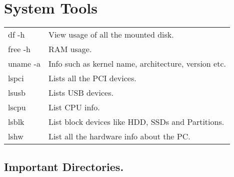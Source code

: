 \section{System Tools}

\begin{tabularx}{\linewidth}{lX}
    df -h                       & View usage of all the mounted disk.\\
    free -h                     & RAM usage.\\
    uname -a                    & Info such as kernel name, architecture, version etc.\\
    \hline

    lspci                       & Lists all the PCI devices.\\
    lsusb                       & Lists USB devices.\\
    lscpu                       & List CPU info.\\
    lsblk                       & List block devices like HDD, SSDs and Partitions.\\
    lshw                        & List all the hardware info about the PC.\\
    \hline
\end{tabularx}

\subsection{Important Directories.}

